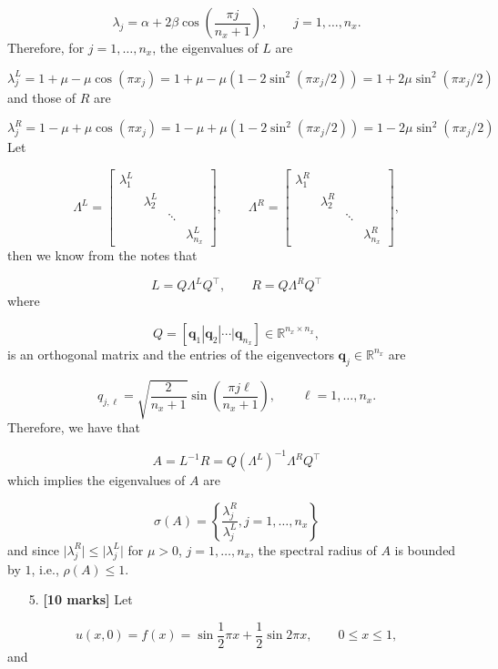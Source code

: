 \documentclass[12pt,a4paper]{article}
\begin{document}
\[
\lambda_j = \alpha + 2\beta\cos\left( \frac{\pi j}{n_x+1}  \right), \qquad j = 1, \ldots, n_x.
\]
Therefore, for $j = 1, \ldots, n_x$, the eigenvalues of $L$ are

\[
\lambda_j^{L} = 1 + \mu - \mu \cos\left(\pi x_j  \right) =  1 + \mu - \mu\left(1 - 2\sin^2\left(\pi x_j /2 \right)\right) = 1 + 2\mu\sin^2(\pi x_j/2)
\]
and those of $R$ are

\[
\lambda_j^{R} = 1 - \mu + \mu \cos\left(\pi x_j  \right) =  1 - \mu + \mu\left(1 - 2\sin^2\left(\pi x_j /2 \right)\right) = 1 - 2\mu\sin^2(\pi x_j/2)
\]
Let

\[
\Lambda^{L} = \begin{bmatrix}
\lambda_1^{L} & & & \\
& \lambda_2^{L} & & \\
 & & \ddots &  \\
&  & & \lambda_{n_x}^{L}
\end{bmatrix}, \qquad
\Lambda^{R} = \begin{bmatrix}
\lambda_1^{R} & & & \\
& \lambda_2^{R} & & \\
 & & \ddots &  \\
&  & & \lambda_{n_x}^{R}
\end{bmatrix},
\]
then we know from the notes that

\[
L = Q\Lambda^{L}Q^{\top}, \qquad R = Q\Lambda^{R}Q^{\top}
\]
where

\[
Q = \left[\mathbf{q}_1 |  \mathbf{q}_2 | \cdots | \mathbf{q}_{n_x}  \right] \in \mathbb{R}^{n_x \times n_x},
\]
is an orthogonal matrix and the entries of the eigenvectors $\mathbf{q}_j \in \mathbb{R}^{n_x}$ are

\[
q_{j,\ell} = \sqrt{\frac{2}{n_x+1}}\sin\left(\frac{\pi j \ell}{n_x+1}   \right), \qquad \ell = 1, \ldots, n_x.
\]
Therefore, we have that

\[
A = L^{-1}R = Q\left( \Lambda^{L}  \right)^{-1}\Lambda^{R}Q^{\top}
\]
which implies the eigenvalues of $A$ are

\[
\sigma(A) = \left\lbrace \frac{\lambda_j^{R}}{\lambda_j^{L}}, j = 1, \ldots, n_x    \right\rbrace
\]
and since $\vert \lambda_j^{R} \vert \leq \vert \lambda_j^{L} \vert$ for $\mu > 0$, $j = 1, \ldots, n_x$, the spectral radius of $A$ is bounded by $1$, i.e., $\rho(A) \leq 1$.

\begin{itemize}
\item[5. ] \textbf{[10 marks]} Let 

\end{itemize}
\[
u(x,0) = f(x) = \sin \frac{1}{2}\pi x + \frac{1}{2}\sin 2\pi x, \qquad 0 \leq x \leq 1, 
\]
and
\end{document}
